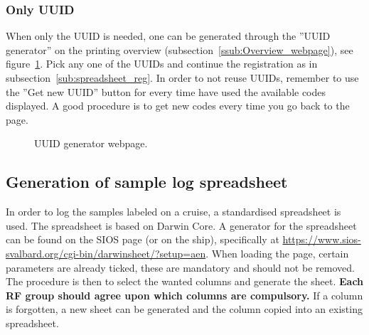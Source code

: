 \documentclass[a4paper,english, 11pt]{article}
\begin{document}
\subsubsection{Only UUID} %
\label{ssub:Only_UUID}

When only the UUID is needed, one can be generated through the ''UUID generator'' on the printing overview (subsection~\ref{ssub:Overview_webpage}), see figure~\ref{fig:uuid_gen}. Pick any one of the UUIDs and continue the registration as in subsection~\ref{sub:spreadsheet_reg}. In order to not reuse UUIDs, remember to use the ''Get new UUID'' button for every time have used the available codes displayed. A good procedure is to get new codes every time you go back to the page.

\begin{figure}[htb]
    \caption{\label{fig:uuid_gen}
        UUID generator webpage.
    }
\end{figure}



\subsection{Generation of sample log spreadsheet} %
\label{sub:Sample_log_spreadsheet_generation}

In order to log the samples labeled on a cruise, a standardised spreadsheet is used. The spreadsheet is based on Darwin Core. A generator for the spreadsheet can be found on the SIOS page (or on the ship), specifically at \url{https://www.sios-svalbard.org/cgi-bin/darwinsheet/?setup=aen}. When loading the page, certain parameters are already ticked, these are mandatory and should not be removed.  
The procedure is then to select the wanted columns and generate the sheet. \textbf{Each RF group should agree upon which columns are compulsory.} If a column is forgotten, a new sheet can be generated and the column copied into an existing spreadsheet.
\end{document}
